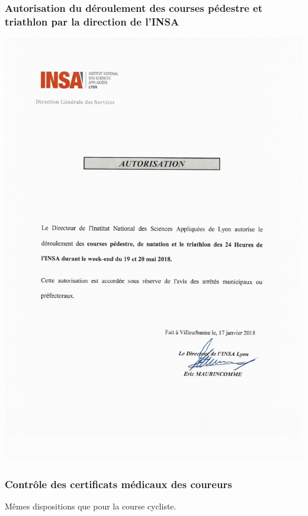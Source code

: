 \documentclass[hidelinks, paper=a4, fontsize=13pt]{report}
\begin{document}
\subsubsection{Autorisation du déroulement des courses pédestre et triathlon par la direction de l’INSA}
\begin{center}
\includegraphics[scale=0.72]{Annexes/Documents/INSAAutorisationAutresCourses}
\end{center}

\subsubsection{Contrôle des certificats médicaux des coureurs}

Mêmes dispositions que pour la course cycliste.
\end{document}
